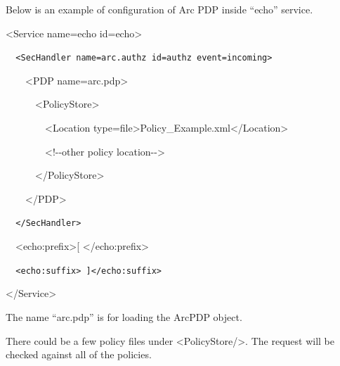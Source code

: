 \documentclass{article}
\begin{document}
{\upshape\color{black}
Below is an example of configuration of Arc PDP inside
{\textquotedblleft}echo{\textquotedblright} service.}

{\ttfamily\color{black}
{\textless}Service name={\textquotedbl}echo{\textquotedbl}
id={\textquotedbl}echo{\textquotedbl}{\textgreater}}

{\upshape\color{black}
\foreignlanguage{spanish}{\texttt{\ \ }}\texttt{{\textless}SecHandler
name={\textquotedbl}arc.authz{\textquotedbl}
id={\textquotedbl}authz{\textquotedbl}
event={\textquotedbl}incoming{\textquotedbl}{\textgreater}}}

{\ttfamily\color{black}
\ \ \ \ {\textless}PDP
name={\textquotedbl}arc.pdp{\textquotedbl}{\textgreater}}

{\ttfamily\color{black}
\ \ \ \ \ \ {\textless}PolicyStore{\textgreater}}

{\ttfamily\color{black}
\ \ \ \ \ \ \ \ {\textless}Location
type={\textquotedbl}file{\textquotedbl}{\textgreater}Policy\_Example.xml{\textless}/Location{\textgreater}}

{\ttfamily\color{black}
\ \ \ \ \ \ \ \ {\textless}!-{}-other policy location-{}-{\textgreater}}

{\ttfamily\color{black}
\ \ \ \ \ \ {\textless}/PolicyStore{\textgreater}}

{\ttfamily\color{black}
\ \ \ \ {\textless}/PDP{\textgreater}}

{\upshape\color{black}
\texttt{\ \ }\foreignlanguage{spanish}{\texttt{{\textless}/SecHandler{\textgreater}}}}

{\ttfamily\color{black}
\ \ {\textless}echo:prefix{\textgreater}[
{\textless}/echo:prefix{\textgreater}}

{\upshape\color{black}
\foreignlanguage{spanish}{\texttt{\ \ }}\texttt{{\textless}echo:suffix{\textgreater}
]{\textless}/echo:suffix{\textgreater}}}

{\ttfamily\color{black}
{\textless}/Service{\textgreater}}

{\color{black}
The name {\textquotedblleft}arc.pdp{\textquotedblright} is for loading
the ArcPDP object.}

{\color{black}
There could be a few policy files under
{\textless}PolicyStore/{\textgreater}. The request will be checked
against all of the policies.}
\end{document}
